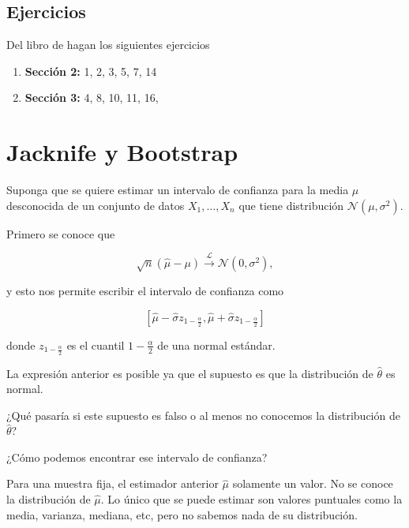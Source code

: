 \documentclass[
  12pt,
]{book}
\providecommand{\tightlist}{%
  \setlength{\itemsep}{0pt}\setlength{\parskip}{0pt}}
\theoremstyle{definition}
\theoremstyle{definition}
\theoremstyle{definition}
\theoremstyle{remark}
\let\BeginKnitrBlock\begin \let\EndKnitrBlock\end
\begin{document}
\hypertarget{ejercicios}{%
\section{Ejercicios}\label{ejercicios}}

Del libro de \autocite{Hardle2004} hagan los siguientes ejercicios

\begin{enumerate}
\def\labelenumi{\arabic{enumi}.}
\tightlist
\item
  \textbf{Sección 2:} 1, 2, 3, 5, 7, 14
\item
  \textbf{Sección 3:} 4, 8, 10, 11, 16,
\end{enumerate}

\hypertarget{jacknife-y-bootstrap}{%
\chapter{Jacknife y Bootstrap}\label{jacknife-y-bootstrap}}

Suponga que se quiere estimar un intervalo de confianza para la media
\(\mu\) desconocida de un conjunto de datos \(X_{1},\ldots, X_{n}\)
que tiene distribución \(\mathcal{N}\left(\mu ,\sigma^{2}\right)\).

Primero se conoce que

\begin{equation*}
\sqrt{n}\left( \hat{\mu} - \mu \right)
\xrightarrow{\mathcal{L}} \mathcal{N}\left(0,\sigma^{2}\right),
\end{equation*}

y esto nos permite escribir el intervalo de confianza como

\begin{equation*}
\left[ \hat{\mu} - \hat{\sigma}z_{1-\frac{\alpha}{2}} ,
\hat{\mu} + \hat{\sigma}z_{1-\frac{\alpha}{2}}\right]
\end{equation*}

donde \(z_{1-\frac{\alpha}{2}}\) es el cuantil \(1-\frac{\alpha}{2}\)
de una normal estándar.

La expresión anterior es posible ya que el supuesto es que la
distribución de \(\hat{\theta}\) es normal.

\BeginKnitrBlock{remark}
{}¿Qué pasaría si este supuesto es falso o al menos no conocemos la
distribución de \(\hat{\theta}\)?

¿Cómo podemos encontrar ese intervalo de confianza?
\EndKnitrBlock{remark}

\BeginKnitrBlock{remark}
{}Para una muestra fija, el estimador anterior \(\hat{\mu}\)
solamente un valor. No se conoce la distribución de \(\hat{\mu}\). Lo
único que se puede estimar son valores puntuales como la media,
varianza, mediana, etc, pero no sabemos nada de su distribución.
\EndKnitrBlock{remark}
\end{document}
